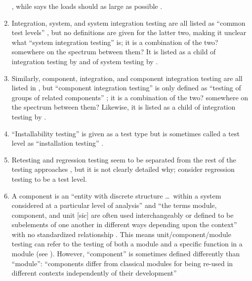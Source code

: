\begin{enumerate}
            \citep[p.~5]{IEEE2022}, while \citeauthor{Patton2006} says the
            loads should as large as possible \citeyearpar[p.~86]{Patton2006}.
      \item Integration, system, and system integration testing are all listed
            as ``common test levels'' \citep[p.~12]{IEEE2022}, but no
            definitions are given for the latter two, making it unclear what
            ``system integration testing'' is; it is a combination of the two?
            somewhere on the spectrum between them? It is listed as a child
            of integration testing by \citetISTQB{} and of system testing
            by \citet[p.~23]{Firesmith2015}.
      \item Similarly, component, integration, and component integration
            testing are all listed in \citep{IEEE2017}, but ``component
            integration testing'' is only defined as ``testing of groups of
            related components'' \citep[p.~82]{IEEE2017}; it is a combination of
            the two? somewhere on the spectrum between them? Likewise, it is
            listed as a child of integration testing by \citetISTQB{}.
      \item ``Installability testing'' is given as a test type
            \citep[p.~22]{IEEE2022} but is sometimes called a test level as
            ``installation testing'' \citep[p.~445]{PetersAndPedrycz2000}.
      \item Retesting and regression testing seem to be separated from the rest
            of the testing approaches \citep[p.~23]{IEEE2022}, but it is not
            clearly detailed why; \citet[p.~3]{BarbosaEtAl2006} consider
            regression testing to be a test level.
      \item A component is an ``entity with discrete structure \dots\ within a
            system considered at a particular level of analysis''
            \citep{ISO_IEC2023b} and ``the terms module, component, and unit
                  [sic] are often used interchangeably or defined to be subelements
            of one another in different ways depending upon the context'' with
            no standardized relationship \citep[p.~82]{IEEE2017}. This means
            unit/component/module testing can refer to the testing of both a
            module and a specific function in a module (see ).
            However, ``component'' is sometimes defined differently than
            ``module'': ``components differ from classical modules for being
            re-used in different contexts independently of their development''

\end{enumerate}
